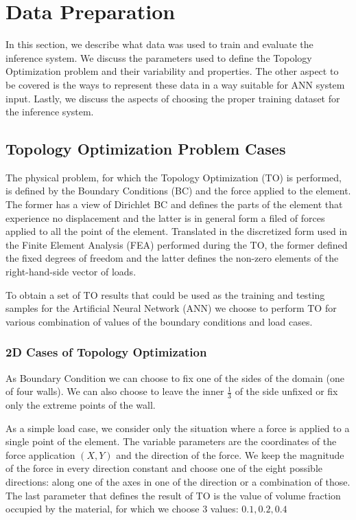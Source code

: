 
\section{Data Preparation}

In this section, we describe what data was used to train and evaluate the inference system.
We discuss the parameters used to define the Topology Optimization problem and their variability and properties.
The other aspect to be covered is the ways to represent these data in a way suitable for ANN system input.
Lastly, we discuss the aspects of choosing the proper training dataset for the inference system.
\medskip

\subsection{Topology Optimization Problem Cases}

The physical problem, for which the Topology Optimization (TO) is performed, is defined by the Boundary Conditions (BC) and the force applied to the element. 
The former has a view of Dirichlet BC and defines the parts of the element that experience no displacement and the latter is in general form a filed of forces applied to all the point of the element. 
Translated in the discretized form used in the Finite Element Analysis (FEA) performed during the TO, the former defined the fixed degrees of freedom and the latter defines the non-zero elements of the right-hand-side vector of loads.
\medskip

To obtain a set of TO results that could be used as the training and testing samples for the Artificial Neural Network (ANN) we choose to perform TO for various combination of values of the boundary conditions and load cases.
\medskip

\subsubsection{2D Cases of Topology Optimization}

As Boundary Condition we can choose to fix one of the sides of the domain (one of four walls). 
We can also choose to leave the inner $\frac{1}{3}$ of the side unfixed or fix only the extreme points of the wall. 
\medskip

As a simple load case, we consider only the situation where a force is applied to a single point of the element. 
The variable parameters are the coordinates of the force application $(X, Y)$ and the direction of the force.
We keep the magnitude of the force in every direction constant and choose one of the eight possible directions: along one of the axes in one of the direction or a combination of those.
The last parameter that defines the result of TO is the value of volume fraction occupied by the material, for which we choose $3$ values: $0.1, 0.2, 0.4$
\medskip

